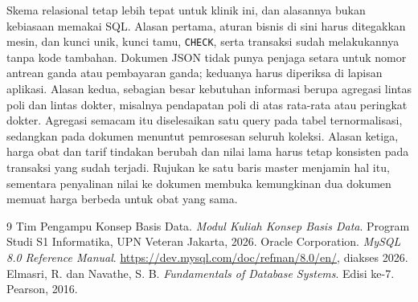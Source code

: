 \documentclass[12pt,a4paper]{article}
\begin{document}
Skema relasional tetap lebih tepat untuk klinik ini, dan alasannya bukan
kebiasaan memakai SQL. Alasan pertama, aturan bisnis di sini harus ditegakkan
mesin, dan kunci unik, kunci tamu, \texttt{CHECK}, serta transaksi sudah
melakukannya tanpa kode tambahan. Dokumen JSON tidak punya penjaga setara untuk
nomor antrean ganda atau pembayaran ganda; keduanya harus diperiksa di lapisan
aplikasi. Alasan kedua, sebagian besar kebutuhan informasi berupa agregasi
lintas poli dan lintas dokter, misalnya pendapatan poli di atas rata-rata atau
peringkat dokter. Agregasi semacam itu diselesaikan satu query pada tabel
ternormalisasi, sedangkan pada dokumen menuntut pemrosesan seluruh koleksi.
Alasan ketiga, harga obat dan tarif tindakan berubah dan nilai lama harus tetap
konsisten pada transaksi yang sudah terjadi. Rujukan ke satu baris master
menjamin hal itu, sementara penyalinan nilai ke dokumen membuka kemungkinan dua
dokumen memuat harga berbeda untuk obat yang sama.

\begin{thebibliography}{9}
   Tim Pengampu Konsep Basis Data. \textit{Modul Kuliah Konsep
    Basis Data}. Program Studi S1 Informatika, UPN Veteran Jakarta, 2026.
   Oracle Corporation. \textit{MySQL 8.0 Reference Manual}.
    \url{https://dev.mysql.com/doc/refman/8.0/en/}, diakses 2026.
   Elmasri, R. dan Navathe, S. B. \textit{Fundamentals of Database
    Systems}. Edisi ke-7. Pearson, 2016.
\end{thebibliography}
\end{document}
